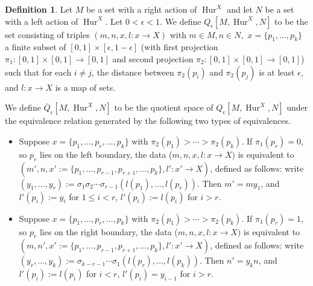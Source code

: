 \documentclass[12 pt]{amsart}
\theoremstyle{plain}
\theoremstyle{definition}
\newtheorem{definition}[theorem]{Definition}
\theoremstyle{remark}
\numberwithin{equation}{section}
\DeclareMathOperator\Hur{Hur}
\begin{document}
\begin{definition}\label{definition:quotientmodel}
	Let $M$ be a set with a right action of $\Hur^X$ and let $N$ be a set with a left action of $\Hur^{X}$. Let $0<\epsilon<1$. We define  $Q_{\epsilon}[M,\Hur^{X},N]$ 
	to be the set consisting of triples $(m,n,x,l: x \to X)$ with $m \in M,
	n \in N,$
	$x = \{p_1, \ldots, p_k\}$ a finite subset of $[0,1]\times [\epsilon,1-\epsilon]$
	(with first projection 
$\pi_1: [0,1] \times [0,1] \to [0,1]$ and
	second projection $\pi_2: [0,1] \times [0,1] \to [0,1]$)
	such that for each $i\neq j$, the distance between $\pi_2(p_i)$ and
	$\pi_2(p_j)$ is at least $\epsilon$, and $l:x \to X$ is a
	map of sets.
	
	We define $\overline{Q}_{\epsilon}[M,\Hur^{X},N]$ to be the quotient space of $Q_{\epsilon}[M,\Hur^{X},N]$
	under the equivalence relation generated by the following two
	types of equivalences.
	
	\begin{itemize}
		\item[$(i)$] Suppose $x = \{p_1, \ldots, p_r,\ldots, p_k\}$ with $\pi_2(p_1) >
			\cdots > \pi_2(p_k)$. If $\pi_1(p_r) = 0$, so $p_r$ lies
			on the left boundary, the data ($m,n,x,l:x \to X)$ is
			equivalent to $(m', n, x' := \{p_1, \ldots, p_{r-1},  p_{r+1},
			\ldots, p_k\}, l': x'\to X)$, defined as follows:
			write
			$(y_1, \ldots, y_r) :=
			\sigma_1\sigma_2\cdots\sigma_{r-1}(l(p_1),
			\ldots, l(p_r)).$
			Then $m' = my_1$, and $l'(p_i) := y_i$ for $1 \leq i < r$, $l'(p_i) := l(p_i)$ for $i > r$.
		\item[$(ii)$] Suppose $x = \{p_1, \ldots, p_r,\ldots, p_k\}$ with
			$\pi_2(p_1) >
			\cdots > \pi_2(p_k)$. If $\pi_1(p_r) = 1$, so $p_r$ lies
			on the right boundary, the data ($m,n,x,l:x \to X)$ is
			equivalent to $(m, n', x' := \{p_1, \ldots, p_{r-1},  p_{r+1},
			\ldots, p_k\}, l': x'\to X)$, defined as follows:
			write
			$(y_r, \ldots, y_k) :=
			\sigma_{k-r-1}\cdots \sigma_{1}(l(p_r),
			\ldots, l(p_k)).$
			Then $n' = y_kn$, and $l'(p_i) := l(p_i)$ for $i < r$,
			$l'(p_i) = y_{i-1}$ for $i> r$.
	\end{itemize}
\end{definition}
\end{document}
